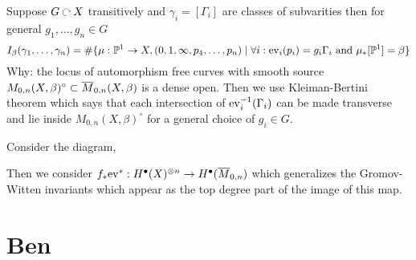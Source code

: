 \documentclass[12pt]{article}
\begin{document}
\begin{example}
Suppose $G \acts X$ transitively and $\gamma_i = [\Gamma_i]$ are classes of subvarities then for general $g_1, \dots, g_n \in G$
\[ I_\beta(\gamma_1, \dots, \gamma_n) = \# \{ \mu : \mathbb{P}^1 \to X, (0,1, \infty, p_4, \dots, p_n) \mid \forall i : \mathrm{ev}_i(p_i) = g_i \Gamma_i \text{ and } \mu_* [\mathbb{P}^1] = \beta \} \]
Why: the locus of automorphism free curves with smooth source $M_{0,n}(X, \beta)^\circ \subset \overline{M}_{0,n}(X, \beta)$ is a dense open. Then we use Kleiman-Bertini theorem which says that each intersection of $\mathrm{ev}_i^{-1}(\Gamma_i)$ can be made transverse and lie inside $M_{0,n}(X, \beta)^\circ$ for a general choice of $g_i \in G$. 
\end{example}

\begin{example}
Consider the diagram,
\begin{center}
\end{center}
Then we consider $f_* \mathrm{ev}^* : H^\bullet(X)^{\otimes n} \to H^\bullet(\overline{M}_{0,n})$ which generalizes the Gromov-Witten invariants which appear as the top degree part of the image of this map. 
\end{example}

\section{Ben}
\end{document}
